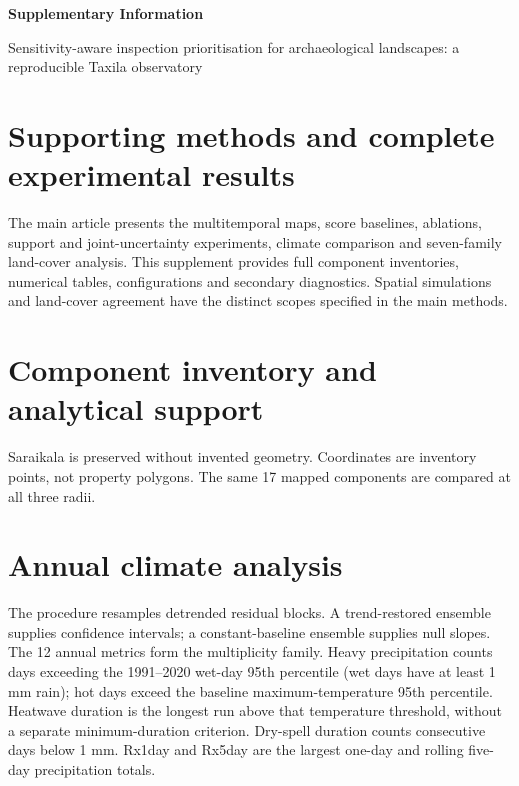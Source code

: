\documentclass[10pt,a4paper]{article}
\begin{document}
\renewcommand{\thesection}{S\arabic{section}}
\renewcommand{\thetable}{S\arabic{table}}
\renewcommand{\thefigure}{S\arabic{figure}}
\begin{center}\Large\bfseries Supplementary Information\end{center}
\begin{center}Sensitivity-aware inspection prioritisation for archaeological landscapes: a reproducible Taxila observatory\end{center}
\section{Supporting methods and complete experimental results}
The main article presents the multitemporal maps, score baselines, ablations, support and joint-uncertainty experiments, climate comparison and seven-family land-cover analysis. This supplement provides full component inventories, numerical tables, configurations and secondary diagnostics. Spatial simulations and land-cover agreement have the distinct scopes specified in the main methods.

\section{Component inventory and analytical support}
Saraikala is preserved without invented geometry. Coordinates are inventory points, not property polygons. The same 17 mapped components are compared at all three radii.

\section{Annual climate analysis}
The procedure resamples detrended residual blocks. A trend-restored ensemble supplies confidence intervals; a constant-baseline ensemble supplies null slopes. The 12 annual metrics form the multiplicity family. Heavy precipitation counts days exceeding the 1991--2020 wet-day 95th percentile (wet days have at least 1 mm rain); hot days exceed the baseline maximum-temperature 95th percentile. Heatwave duration is the longest run above that temperature threshold, without a separate minimum-duration criterion. Dry-spell duration counts consecutive days below 1 mm. Rx1day and Rx5day are the largest one-day and rolling five-day precipitation totals.
\end{document}
